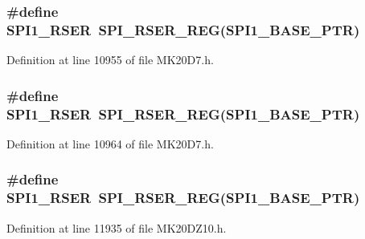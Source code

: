 \subsubsection[{\texorpdfstring{S\+P\+I1\+\_\+\+R\+S\+ER}{SPI1_RSER}}]{\setlength{\rightskip}{0pt plus 5cm}\#define S\+P\+I1\+\_\+\+R\+S\+ER~{\bf S\+P\+I\+\_\+\+R\+S\+E\+R\+\_\+\+R\+EG}({\bf S\+P\+I1\+\_\+\+B\+A\+S\+E\+\_\+\+P\+TR})}\hypertarget{group___s_p_i___register___accessor___macros_ga12df97e0d55761a6643307e86ee4f61c}{}\label{group___s_p_i___register___accessor___macros_ga12df97e0d55761a6643307e86ee4f61c}


Definition at line 10955 of file M\+K20\+D7.\+h.

\subsubsection[{\texorpdfstring{S\+P\+I1\+\_\+\+R\+S\+ER}{SPI1_RSER}}]{\setlength{\rightskip}{0pt plus 5cm}\#define S\+P\+I1\+\_\+\+R\+S\+ER~{\bf S\+P\+I\+\_\+\+R\+S\+E\+R\+\_\+\+R\+EG}({\bf S\+P\+I1\+\_\+\+B\+A\+S\+E\+\_\+\+P\+TR})}\hypertarget{group___s_p_i___register___accessor___macros_ga12df97e0d55761a6643307e86ee4f61c}{}\label{group___s_p_i___register___accessor___macros_ga12df97e0d55761a6643307e86ee4f61c}


Definition at line 10964 of file M\+K20\+D7.\+h.

\subsubsection[{\texorpdfstring{S\+P\+I1\+\_\+\+R\+S\+ER}{SPI1_RSER}}]{\setlength{\rightskip}{0pt plus 5cm}\#define S\+P\+I1\+\_\+\+R\+S\+ER~{\bf S\+P\+I\+\_\+\+R\+S\+E\+R\+\_\+\+R\+EG}({\bf S\+P\+I1\+\_\+\+B\+A\+S\+E\+\_\+\+P\+TR})}\hypertarget{group___s_p_i___register___accessor___macros_ga12df97e0d55761a6643307e86ee4f61c}{}\label{group___s_p_i___register___accessor___macros_ga12df97e0d55761a6643307e86ee4f61c}


Definition at line 11935 of file M\+K20\+D\+Z10.\+h.

